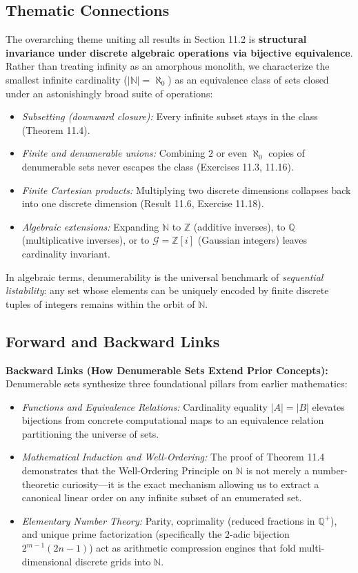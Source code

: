 \documentclass[11pt, letterpaper]{article}
\theoremstyle{definition}
\theoremstyle{remark}
\begin{document}
\subsection{Thematic Connections}

The overarching theme uniting all results in Section 11.2 is \textbf{structural invariance under discrete algebraic operations via bijective equivalence}. Rather than treating infinity as an amorphous monolith, we characterize the smallest infinite cardinality ($|\mathbb{N}| = \aleph_0$) as an equivalence class of sets closed under an astonishingly broad suite of operations:
\begin{itemize}
    \item \emph{Subsetting (downward closure):} Every infinite subset stays in the class (Theorem 11.4).
    \item \emph{Finite and denumerable unions:} Combining $2$ or even $\aleph_0$ copies of denumerable sets never escapes the class (Exercises 11.3, 11.16).
    \item \emph{Finite Cartesian products:} Multiplying two discrete dimensions collapses back into one discrete dimension (Result 11.6, Exercise 11.18).
    \item \emph{Algebraic extensions:} Expanding $\mathbb{N}$ to $\mathbb{Z}$ (additive inverses), to $\mathbb{Q}$ (multiplicative inverses), or to $\mathcal{G} = \mathbb{Z}[i]$ (Gaussian integers) leaves cardinality invariant.
\end{itemize}
In algebraic terms, denumerability is the universal benchmark of \emph{sequential listability}: any set whose elements can be uniquely encoded by finite discrete tuples of integers remains within the orbit of $\mathbb{N}$.

\subsection{Forward and Backward Links}

\textbf{Backward Links (How Denumerable Sets Extend Prior Concepts):}
Denumerable sets synthesize three foundational pillars from earlier mathematics:
\begin{itemize}
    \item \emph{Functions and Equivalence Relations:} Cardinality equality $|A| = |B|$ elevates bijections from concrete computational maps to an equivalence relation partitioning the universe of sets.
    \item \emph{Mathematical Induction and Well-Ordering:} The proof of Theorem 11.4 demonstrates that the Well-Ordering Principle on $\mathbb{N}$ is not merely a number-theoretic curiosity---it is the exact mechanism allowing us to extract a canonical linear order on any infinite subset of an enumerated set.
    \item \emph{Elementary Number Theory:} Parity, coprimality (reduced fractions in $\mathbb{Q}^+$), and unique prime factorization (specifically the $2$-adic bijection $2^{m-1}(2n-1)$) act as arithmetic compression engines that fold multi-dimensional discrete grids into $\mathbb{N}$.
\end{itemize}
\end{document}
